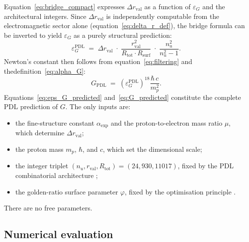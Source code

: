 \documentclass[11pt,a4paper]{article}
\begin{document}
Equation~\eqref{eq:bridge_compact} expresses $\Delta r_{\mathrm{val}}$ as a function of $\varepsilon_G$ and the architectural integers. Since $\Delta r_{\mathrm{val}}$ is independently computable from the electromagnetic sector alone (equation~\eqref{eq:delta_r_def}), the bridge formula can be inverted to yield $\varepsilon_G$ as a purely structural prediction:
\begin{equation}
    \varepsilon_G^{\mathrm{PDL}} 
    \;=\; \Delta r_{\mathrm{val}}\;\cdot\;
    \frac{r_{\mathrm{val}}^2}{R_{\mathrm{tot}}\cdot R_{\mathrm{surf}}}
    \;\cdot\;
    \frac{n_u^2}{n_u^2-1}.
    \label{eq:eps_G_predicted}
\end{equation}
Newton's constant then follows from equation~\eqref{eq:filtering} and thedefinition~\eqref{eq:alpha_G}:
\begin{equation}
    G_{\mathrm{PDL}} 
    \;=\; \left(\varepsilon_G^{\mathrm{PDL}}\right)^{18}
          \frac{\hbar\,c}{m_p^2}.
    \label{eq:G_predicted}
\end{equation}
Equations~\eqref{eq:eps_G_predicted} and~\eqref{eq:G_predicted} constitute the complete PDL prediction of $G$. The only inputs are:
\begin{itemize}
    \item the fine-structure constant $\alpha_{\exp}$ and the 
          proton-to-electron mass ratio $\mu$, which determine 
          $\Delta r_{\mathrm{val}}$;
    \item the proton mass $m_p$, $\hbar$, and $c$, which set the 
          dimensional scale;
    \item the integer triplet $(n_u, r_{\mathrm{val}}, R_{\mathrm{tot}}) 
          = (24, 930, 11017)$, fixed by the PDL combinatorial 
          architecture \cite{Combinatorial_Proton_v2_2026};
    \item the golden-ratio surface parameter $\varphi$, 
          fixed by the optimisation principle 
          \cite{Golden_Ratio_PDL_2026}.
\end{itemize}
There are no free parameters.

\subsection{Numerical evaluation}
\end{document}
